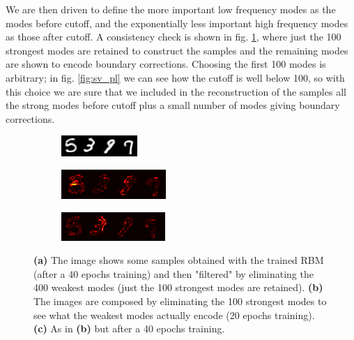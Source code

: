 \documentclass{revtex4-1}
\begin{document}
We are then driven to define the more important low frequency modes as the modes before cutoff, and the exponentially less important high frequency modes as those after cutoff. A consistency check is shown in fig. \ref{fig:hf_modes}, where just the 100 strongest modes are retained to construct the samples and the remaining modes are shown to encode boundary corrections. Choosing the first 100 modes is arbitrary; in fig. \ref{fig:sv_pl} we can see how the cutoff is well below 100, so with this choice we are sure that we included in the reconstruction of the samples all the strong modes before cutoff plus a small number of modes giving boundary corrections.

\begin{figure}
  \begin{subfigure}{\linewidth}
  	\centering
    \includegraphics[width=.8\linewidth]{complete40ep.png}
    \caption{}
  \end{subfigure}\par
  \begin{subfigure}{\linewidth}
  	\centering
    \includegraphics[width=.8\linewidth]{difference20ep.png}
    \caption{}  
  \end{subfigure}\par
  \begin{subfigure}{\linewidth}
  	\centering
    \includegraphics[width=.8\linewidth]{difference40ep.png}
    \caption{}
  \end{subfigure}
  \caption{\textbf{(a)} The image shows some samples obtained with the trained RBM (after a 40 epochs training) and then "filtered" by eliminating the 400 weakest modes (just the 100 strongest modes are retained). \textbf{(b)} The images are composed by eliminating the 100 strongest modes to see what the weakest modes actually encode (20 epochs training). \textbf{(c)} As in \textbf{(b)} but after a 40 epochs training.}
  \label{fig:hf_modes}
\end{figure}

 

\end{document}
